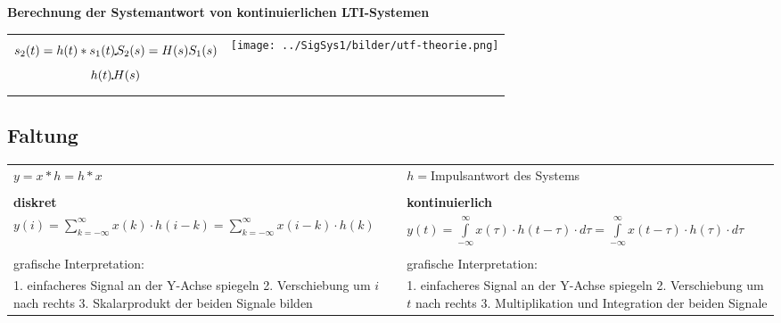 		\textbf{Berechnung der Systemantwort von kontinuierlichen LTI-Systemen}\\
		\begin{tabular}{ll}
			\parbox{8cm}{
			$$s_2(t) = h(t) * s_1(t) \FT S_2(s) = H(s) S_1(s)$$
			$$h(t) \FT H(s)$$}
			& \parbox{8cm}{
			\texttt{[image: ../SigSys1/bilder/utf-theorie.png]}}\\
		\end{tabular}	
		
	\subsection{Faltung}
		\begin{tabular}{ll}
	        $\boxed{y=x*h=h*x}$&$h=$Impulsantwort des Systems\\ & \\
	   		\textbf{diskret}& \textbf{kontinuierlich}\\
	   		$\boxed{y(i)=\sum\limits_{k=-\infty}^{\infty}x(k)\cdot
	   		h(i-k)=\sum\limits_{k=-\infty}^{\infty}x(i-k)\cdot h(k)}$&
	   		$\boxed{y(t)=\int\limits_{-\infty}^{\infty}x(\tau)\cdot
	   		h(t-\tau)\cdot d\tau=\int\limits_{-\infty}^{\infty}x(t-\tau)\cdot
	   		h(\tau)\cdot d\tau}$\\ & \\
	   		grafische Interpretation: & grafische Interpretation:\\
	   		\parbox{8cm}{1. einfacheres Signal an der Y-Achse spiegeln\\
	   					2. Verschiebung um  $i$ nach rechts\\
	   					3. Skalarprodukt der beiden Signale bilden}&
			\parbox{8cm}{1. einfacheres Signal an der Y-Achse spiegeln\\
			 			2. Verschiebung um $t$ nach rechts\\
			 			3. Multiplikation und Integration der beiden Signale}		
        \end{tabular}
	